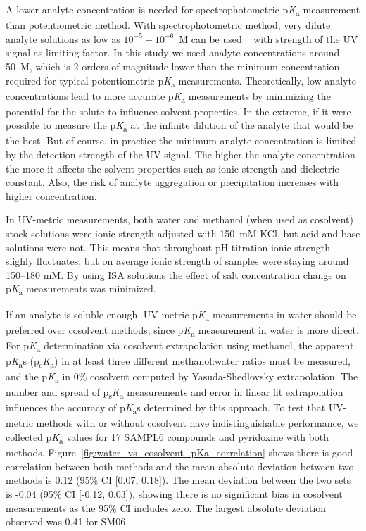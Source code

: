 \documentclass[9pt,lineno]{elife}
\newcommand{\pKa}{p\textit{K}\textsubscript{a}}
\newcommand{\psKa}{p\textsubscript{s}\textit{K}\textsubscript{a}}
\begin{document}
A lower analyte concentration is needed for spectrophotometric \pKa{} measurement than potentiometric method. With spectrophotometric method, very dilute analyte solutions as low as $10^{-5}-10^{-6}$~M can be used ~\citep{tam_multi-wavelength_2001} with strength of the UV signal as limiting factor. In this study we used analyte concentrations around 50~\micro{}M, which is 2 orders of magnitude lower than the minimum concentration required for typical potentiometric \pKa{} measurements. Theoretically, low analyte concentrations lead to more accurate \pKa{} measurements by minimizing the potential for the solute to influence solvent properties. In the extreme, if it were possible to measure the \pKa{} at the infinite dilution of the analyte that would be the best. But of course, in practice the minimum analyte concentration is limited by the detection strength of the UV signal. The higher the analyte concentration the more it affects the solvent properties such as ionic strength and dielectric constant. Also, the risk of analyte aggregation or precipitation increases with higher concentration.

In UV-metric measurements, both water and methanol (when used as cosolvent) stock solutions were ionic strength adjusted with 150~mM KCl, but acid and base solutions were not. This means that throughout pH titration ionic strength slighly fluctuates, but on average ionic strength of samples were staying around 150--180 mM. 
By using ISA solutions the effect of salt concentration change on \pKa{} measurements was minimized.

If an analyte is soluble enough, UV-metric \pKa{} measurements in water should be preferred over cosolvent methods, since \pKa{} measurement in water is more direct. 
For \pKa{} determination via cosolvent extrapolation using methanol, the apparent \pKa{}s (\psKa) in at least three different methanol:water ratios must be measured, and the \pKa{} in 0\% cosolvent computed by Yasuda-Shedlovsky extrapolation. 
The number and spread of \psKa{} measurements and error in linear fit extrapolation influences the accuracy of \pKa{}s determined by this approach. 
To test that UV-metric methods with or without cosolvent have indistinguishable performance, we collected \pKa{} values for 17 SAMPL6 compounds and pyridoxine with both methods. 
Figure~\ref{fig:water_vs_cosolvent_pKa_correlation} shows there is good correlation between both methods and the mean absolute deviation between two methods is 0.12 (95\% CI [0.07, 0.18]). 
The mean deviation between the two sets is -0.04 (95\% CI [-0.12, 0.03]), showing there is no significant bias in cosolvent measurements as the 95\% CI includes zero. 
The largest absolute deviation observed was 0.41 for SM06. 
\end{document}
